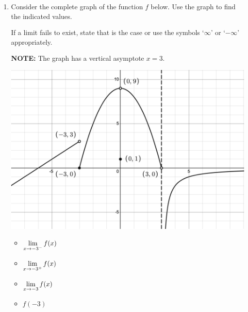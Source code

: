 \label{ExercisesforIntroLimits}

\begin{enumerate}

\item  Consider the complete graph of the function $f$ below.  Use the graph to find the indicated values.

\smallskip

If a limit fails to exist, state that is the case  or use the symbols `$\infty$' or `$-\infty$' appropriately.
 
 \smallskip
 
 \textbf{NOTE:}  The graph has a vertical asymptote $x=3$.  

\begin{center}

\includegraphics[width=5.5in]{./IntroLimitsGraphics/M2500TH01.png}

\end{center}

\bigskip

\begin{multicols}{4}

\begin{itemize}

\item $\displaystyle{\lim_{x \rightarrow -3^{-}} f(x)}$

\item $\displaystyle{\lim_{x \rightarrow -3^{+}} f(x)}$

\item $\displaystyle{\lim_{x \rightarrow -3} f(x)}$

\item $f(-3)$

\end{itemize}


\end{multicols}
\end{enumerate}
